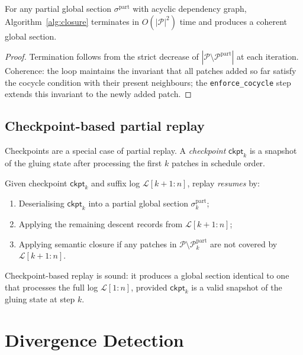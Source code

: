 \documentclass[11pt]{article}
\newcommand{\TraceLog}{\mathcal{L}}
\newcommand{\PatchSet}{\mathcal{P}}
\newcommand{\Ckpt}{\mathsf{ckpt}}
\newcommand{\GS}{\sigma}                   %
\begin{document}
\begin{theorem}
\label{thm:closure-term}
For any partial global section $\GS^{\mathrm{part}}$ with acyclic
dependency graph, Algorithm~\ref{alg:closure} terminates in
$O(|\PatchSet|^2)$ time and produces a coherent global section.
\end{theorem}

\begin{proof}
Termination follows from the strict decrease of
$|\PatchSet \setminus \PatchSet^{\mathrm{part}}|$ at each iteration.
Coherence: the loop maintains the invariant that all patches added so
far satisfy the cocycle condition with their present neighbours; the
\texttt{enforce\_cocycle} step extends this invariant to the newly added
patch.
\end{proof}

\subsection{Checkpoint-based partial replay}

Checkpoints are a special case of partial replay.  A
\emph{checkpoint} $\Ckpt_k$ is a snapshot of the gluing state after
processing the first $k$ patches in schedule order.

\begin{definition}
Given checkpoint $\Ckpt_k$ and suffix log $\TraceLog[k+1:n]$, replay
\emph{resumes} by:
\begin{enumerate}
\item Deserialising $\Ckpt_k$ into a partial global section
  $\GS^{\mathrm{part}}_k$;
\item Applying the remaining descent records from $\TraceLog[k+1:n]$;
\item Applying semantic closure if any patches in
  $\PatchSet \setminus \PatchSet^{\mathrm{part}}_k$ are not covered by
  $\TraceLog[k+1:n]$.
\end{enumerate}
\end{definition}

\begin{corollary}
Checkpoint-based replay is sound: it produces a global section
identical to one that processes the full log $\TraceLog[1:n]$, provided
$\Ckpt_k$ is a valid snapshot of the gluing state at step $k$.
\end{corollary}


\section{Divergence Detection}
\label{sec:divergence}
\end{document}
